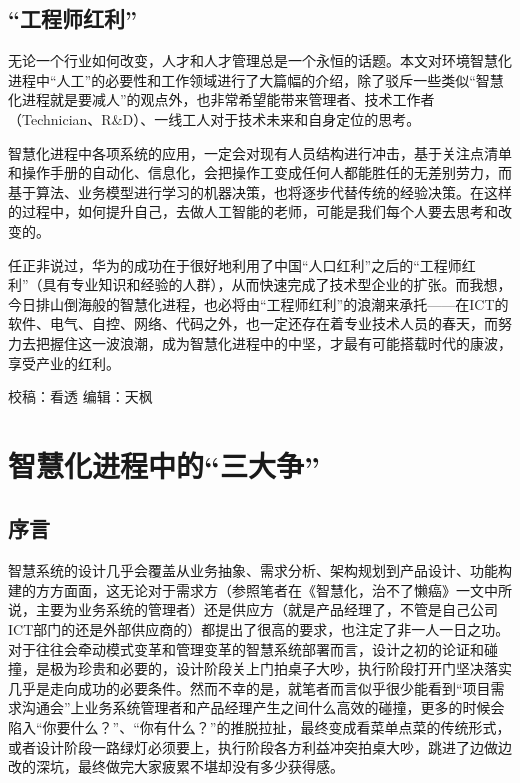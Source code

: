 \documentclass[]{book}
\begin{document}
\hypertarget{ux5de5ux7a0bux5e08ux7ea2ux5229}{%
\subsection{``工程师红利''}\label{ux5de5ux7a0bux5e08ux7ea2ux5229}}

无论一个行业如何改变，人才和人才管理总是一个永恒的话题。本文对环境智慧化进程中``人工''的必要性和工作领域进行了大篇幅的介绍，除了驳斥一些类似``智慧化进程就是要减人''的观点外，也非常希望能带来管理者、技术工作者（Technician、R\&D）、一线工人对于技术未来和自身定位的思考。

智慧化进程中各项系统的应用，一定会对现有人员结构进行冲击，基于关注点清单和操作手册的自动化、信息化，会把操作工变成任何人都能胜任的无差别劳力，而基于算法、业务模型进行学习的机器决策，也将逐步代替传统的经验决策。在这样的过程中，如何提升自己，去做人工智能的老师，可能是我们每个人要去思考和改变的。

任正非说过，华为的成功在于很好地利用了中国``人口红利''之后的``工程师红利''（具有专业知识和经验的人群），从而快速完成了技术型企业的扩张。而我想，今日排山倒海般的智慧化进程，也必将由``工程师红利''的浪潮来承托------在ICT的软件、电气、自控、网络、代码之外，也一定还存在着专业技术人员的春天，而努力去把握住这一波浪潮，成为智慧化进程中的中坚，才最有可能搭载时代的康波，享受产业的红利。

校稿：看透
编辑：天枫

\hypertarget{ux667aux6167ux5316ux8fdbux7a0bux4e2dux7684ux4e09ux5927ux4e89}{%
\section{智慧化进程中的``三大争''}\label{ux667aux6167ux5316ux8fdbux7a0bux4e2dux7684ux4e09ux5927ux4e89}}

\hypertarget{ux5e8fux8a00-1}{%
\subsection{序言}\label{ux5e8fux8a00-1}}

智慧系统的设计几乎会覆盖从业务抽象、需求分析、架构规划到产品设计、功能构建的方方面面，这无论对于需求方（参照笔者在《智慧化，治不了懒癌》一文中所说，主要为业务系统的管理者）还是供应方（就是产品经理了，不管是自己公司ICT部门的还是外部供应商的）都提出了很高的要求，也注定了非一人一日之功。对于往往会牵动模式变革和管理变革的智慧系统部署而言，设计之初的论证和碰撞，是极为珍贵和必要的，设计阶段关上门拍桌子大吵，执行阶段打开门坚决落实几乎是走向成功的必要条件。然而不幸的是，就笔者而言似乎很少能看到``项目需求沟通会''上业务系统管理者和产品经理产生之间什么高效的碰撞，更多的时候会陷入``你要什么？''、``你有什么？''的推脱拉扯，最终变成看菜单点菜的传统形式，或者设计阶段一路绿灯必须要上，执行阶段各方利益冲突拍桌大吵，跳进了边做边改的深坑，最终做完大家疲累不堪却没有多少获得感。
\end{document}
